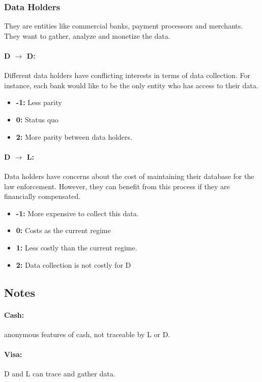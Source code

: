 \documentclass[runningheads]{llncs}
\begin{document}
 \subsubsection{Data Holders} 
 They are entities like commercial banks, payment processors and merchants. They want to gather, analyze and monetize the data.
 
  \paragraph{D $\rightarrow$ D:}
 Different data holders have conflicting interests in terms of data collection. For instance, each bank would like to be the only entity who has access to their data.
 \begin{itemize}
 	
 	\item \textbf{-1:} Less parity
 	\item \textbf{0:}  Status quo
 	\item \textbf{2:} More parity between data holders.
 \end{itemize}
 
 \paragraph{D $\rightarrow$ L:}
 Data holders have concerns about the cost of maintaining their database for the law enforcement. However, they can benefit from this process if they are financially compensated.
   \begin{itemize}
 	\item \textbf{-1:} More expensive to collect this data.
 	\item \textbf{0:} Costs as the current regime
 	\item \textbf{1:} Less costly than the current regime.
 	\item \textbf{2:} Data collection is not costly for D
 \end{itemize}
 
 
 \subsection*{Notes}
  \paragraph{Cash:}  anonymous features of cash, not traceable by L or D.
 
 \paragraph{Visa:} D and L  can trace and gather data.
 
\end{document}

